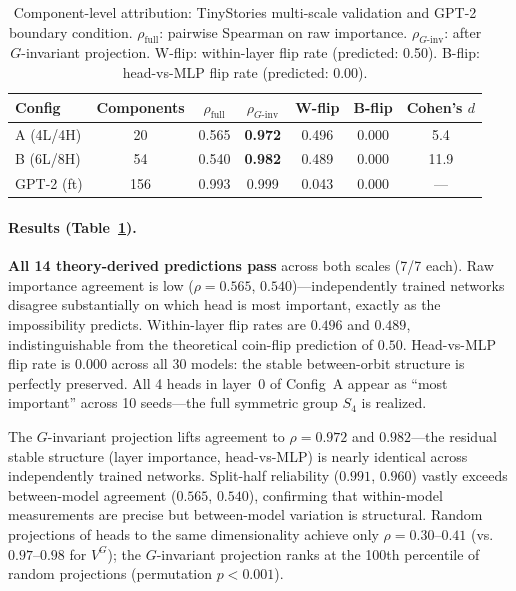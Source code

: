 \documentclass{article}
\begin{document}
\begin{table}[t]
\centering
\caption{Component-level attribution: TinyStories multi-scale validation and GPT-2 boundary condition. $\rho_{\text{full}}$: pairwise Spearman on raw importance. $\rho_{G\text{-inv}}$: after $G$-invariant projection. W-flip: within-layer flip rate (predicted: 0.50). B-flip: head-vs-MLP flip rate (predicted: 0.00).}
\label{tab:tinystories}
\small
\begin{tabular}{@{}lcccccc@{}}
\toprule
Config & Components & $\rho_{\text{full}}$ & $\rho_{G\text{-inv}}$ & W-flip & B-flip & Cohen's $d$ \\
\midrule
A (4L/4H) & 20 & 0.565 & \textbf{0.972} & 0.496 & 0.000 & 5.4 \\
B (6L/8H) & 54 & 0.540 & \textbf{0.982} & 0.489 & 0.000 & 11.9 \\
\midrule
GPT-2 (ft) & 156 & 0.993 & 0.999 & 0.043 & 0.000 & --- \\
\bottomrule
\end{tabular}
\end{table}

\paragraph{Results (Table~\ref{tab:tinystories}).}
\textbf{All 14 theory-derived predictions pass} across both scales (7/7 each).
Raw importance agreement is low ($\rho = 0.565$, $0.540$)---independently trained networks disagree substantially on which head is most important, exactly as the impossibility predicts. Within-layer flip rates are $0.496$ and $0.489$, indistinguishable from the theoretical coin-flip prediction of $0.50$. Head-vs-MLP flip rate is $0.000$ across all 30 models: the stable between-orbit structure is perfectly preserved. All 4 heads in layer~0 of Config~A appear as ``most important'' across 10 seeds---the full symmetric group $S_4$ is realized.

The $G$-invariant projection lifts agreement to $\rho = 0.972$ and $0.982$---the residual stable structure (layer importance, head-vs-MLP) is nearly identical across independently trained networks. Split-half reliability ($0.991$, $0.960$) vastly exceeds between-model agreement ($0.565$, $0.540$), confirming that within-model measurements are precise but between-model variation is structural. Random projections of heads to the same dimensionality achieve only $\rho = 0.30$--$0.41$ (vs.\ $0.97$--$0.98$ for $V^G$); the $G$-invariant projection ranks at the 100th percentile of random projections (permutation $p < 0.001$).
\end{document}

